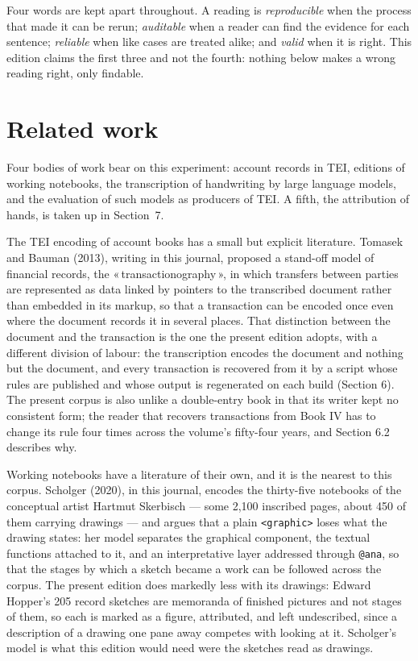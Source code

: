 \documentclass[11pt]{article}
\newcommand{\q}[1]{«\,#1\,»}
\begin{document}
Four words are kept apart throughout. A reading is \emph{reproducible} when
the process that made it can be rerun; \emph{auditable} when a reader can
find the evidence for each sentence; \emph{reliable} when like cases are
treated alike; and \emph{valid} when it is right. This edition claims the
first three and not the fourth: nothing below makes a wrong reading right,
only findable.

\section{Related work}

Four bodies of work bear on this experiment: account records in TEI, editions of working notebooks, the transcription of handwriting by large language models, and the evaluation of such models as producers of TEI. A fifth, the attribution of hands, is taken up in Section~7.

The TEI encoding of account books has a small but explicit literature. Tomasek and Bauman (2013), writing in this journal, proposed a stand-off model of financial records, the \q{transactionography}, in which transfers between parties are represented as data linked by pointers to the transcribed document rather than embedded in its markup, so that a transaction can be encoded once even where the document records it in several places. That distinction between the document and the transaction is the one the present edition adopts, with a different division of labour: the transcription encodes the document and nothing but the document, and every transaction is recovered from it by a script whose rules are published and whose output is regenerated on each build (Section 6). The present corpus is also unlike a double-entry book in that its writer kept no consistent form; the reader that recovers transactions from Book IV has to change its rule four times across the volume's fifty-four years, and Section 6.2 describes why.

Working notebooks have a literature of their own, and it is the nearest to this
corpus. Scholger (2020), in this journal, encodes the thirty-five notebooks of
the conceptual artist Hartmut Skerbisch --- some 2,100 inscribed pages, about
450 of them carrying drawings --- and argues that a plain \texttt{<graphic>}
loses what the drawing states: her model separates the graphical component, the
textual functions attached to it, and an interpretative layer addressed through
\texttt{@ana}, so that the stages by which a sketch became a work can be
followed across the corpus. The present edition does markedly less with its
drawings: Edward Hopper's 205 record sketches are memoranda of finished
pictures and not stages of them, so each is marked as a figure, attributed,
and left undescribed, since a description of a drawing one pane away competes
with looking at it. Scholger's model is what this edition would need were the sketches read as
drawings.
\end{document}
